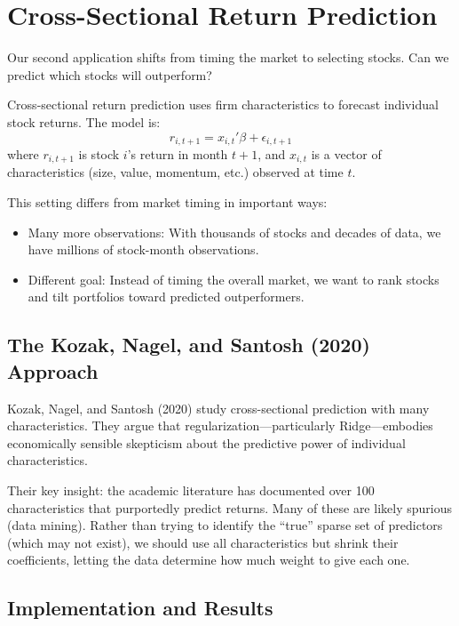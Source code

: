 \documentclass[11pt,a4paper]{article}
\begin{document}
\section{Cross-Sectional Return Prediction}

Our second application shifts from timing the market to selecting stocks. Can we predict which stocks will outperform?

Cross-sectional return prediction uses firm characteristics to forecast individual stock returns. The model is:
\[
r_{i,t+1} = x_{i,t}'\beta + \epsilon_{i,t+1}
\]
where $r_{i,t+1}$ is stock $i$'s return in month $t+1$, and $x_{i,t}$ is a vector of characteristics (size, value, momentum, etc.) observed at time $t$.

This setting differs from market timing in important ways:
\begin{itemize}
    \item Many more observations: With thousands of stocks and decades of data, we have millions of stock-month observations.
    \item Different goal: Instead of timing the overall market, we want to rank stocks and tilt portfolios toward predicted outperformers.
\end{itemize}

\subsection{The Kozak, Nagel, and Santosh (2020) Approach}

Kozak, Nagel, and Santosh (2020) study cross-sectional prediction with many characteristics. They argue that regularization---particularly Ridge---embodies economically sensible skepticism about the predictive power of individual characteristics.

Their key insight: the academic literature has documented over 100 characteristics that purportedly predict returns. Many of these are likely spurious (data mining). Rather than trying to identify the ``true'' sparse set of predictors (which may not exist), we should use all characteristics but shrink their coefficients, letting the data determine how much weight to give each one.

\subsection{Implementation and Results}
\end{document}
